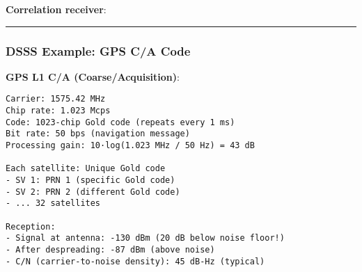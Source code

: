 \textbf{Correlation receiver}:

\begin{Shaded}
\begin{Highlighting}[]
\CommentTok{    }
\CommentTok{    }
\OperatorTok{=}\OperatorTok{*}
    
\OperatorTok{=} 
\OperatorTok{=}\NormalTok{ []}
    
     \NormalTok{(}\NormalTok{, }
\OperatorTok{=}\NormalTok{(despread[i:i}\OperatorTok{+}\NormalTok{N\_chips])}
 \OperatorTok{\textgreater{}}   \NormalTok{)}
    
\end{Highlighting}
\end{Shaded}

\begin{center}\rule{0.5\linewidth}{0.5pt}\end{center}

\subsubsection{DSSS Example: GPS C/A
Code}\label{dsss-example-gps-ca-code}

\textbf{GPS L1 C/A (Coarse/Acquisition)}:

\begin{verbatim}
Carrier: 1575.42 MHz
Chip rate: 1.023 Mcps
Code: 1023-chip Gold code (repeats every 1 ms)
Bit rate: 50 bps (navigation message)
Processing gain: 10·log(1.023 MHz / 50 Hz) = 43 dB

Each satellite: Unique Gold code
- SV 1: PRN 1 (specific Gold code)
- SV 2: PRN 2 (different Gold code)
- ... 32 satellites

Reception:
- Signal at antenna: -130 dBm (20 dB below noise floor!)
- After despreading: -87 dBm (above noise)
- C/N (carrier-to-noise density): 45 dB-Hz (typical)
\end{verbatim}

